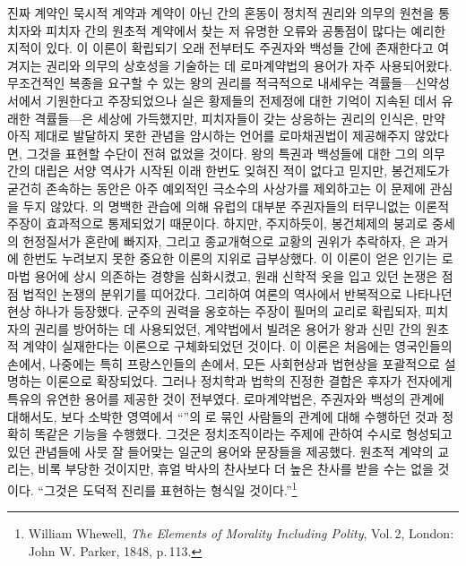 진짜 계약인 묵시적 계약과 계약이 아닌  간의 혼동이
정치적 권리와 의무의 원천을
통치자와 피치자 간의 원초적 계약에서
찾는
저 유명한 오류와 공통점이 많다는 예리한 지적이 있다.
이 이론이 확립되기 오래 전부터도
주권자와 백성들 간에 존재한다고 여겨지는
권리와 의무의 상호성을 기술하는 데
로마계약법의 용어가 자주 사용되어왔다.
무조건적인 복종을 요구할 수 있는 왕의 권리를 적극적으로 내세우는
격률들---신약성서에서 기원한다고 주장되었으나 실은
황제들의 전제정에 대한 기억이 지속된 데서 유래한 격률들---은
세상에 가득했지만,
피치자들이 갖는 상응하는 권리의 인식은,
만약
아직 제대로 발달하지 못한 관념을 암시하는 언어를
로마채권법이
제공해주지 않았다면,
그것을 표현할 수단이 전혀 없었을 것이다.
왕의 특권과 백성들에 대한 그의 의무 간의 대립은
서양 역사가 시작된 이래 한번도 잊혀진 적이 없다고 믿지만,
봉건제도가 굳건히 존속하는 동안은
아주 예외적인 극소수의 사상가를 제외하고는
이 문제에 관심을 두지 않았다.
의 명백한 관습에 의해
유럽의 대부분 주권자들의 터무니없는 이론적 주장이
효과적으로 통제되었기 때문이다.
하지만,
주지하듯이,
봉건체제의 붕괴로 중세의 헌정질서가 혼란에 빠지자,
그리고
종교개혁으로 교황의 권위가 추락하자,
은
과거에 한번도 누려보지 못한
중요한 이론의 지위로
급부상했다.
이 이론이 얻은 인기는
로마법 용어에 상시 의존하는 경향을 심화시켰고,
원래 신학적 옷을 입고 있던 논쟁은
점점
법적인 논쟁의 분위기를 띠어갔다.
그리하여 여론의 역사에서 반복적으로 나타나던 현상 하나가 등장했다.
군주의 권력을 옹호하는 주장이 필머의 교리로
확립되자,
피치자의 권리를 방어하는 데 사용되었던,
계약법에서 빌려온
용어가
왕과 신민 간의 원초적 계약이 실재한다는 이론으로
구체화되었던 것이다.
이 이론은 처음에는 영국인들의 손에서,
나중에는 특히 프랑스인들의 손에서,
모든 사회현상과 법현상을 포괄적으로 설명하는 이론으로 확장되었다.
그러나
정치학과 법학의 진정한 결합은
후자가 전자에게
특유의 유연한 용어를 제공한 것이 전부였다.
로마계약법은,
주권자와 백성의 관계에 대해서도,
보다 소박한 영역에서
``''의 로 묶인 사람들의 관계에 대해 수행하던 것과
정확히 똑같은 기능을 수행했다.
그것은
정치조직이라는 주제에 관하여 수시로 형성되고 있던 관념들에
사뭇 잘 들어맞는
일군의 용어와 문장들을 제공했다.
원초적 계약의 교리는,
비록 부당한 것이지만,
휴얼 박사의
찬사보다 더 높은 찬사를 받을 수는 없을 것이다.
``그것은 도덕적 진리를 표현하는  형식일 것이다.''\footnote{%
  \latinmarks
  William Whewell,
  \textit{The Elements of Morality Including Polity},
  Vol.\,2,
  London: John W. Parker, 1848,
  p.\,113.
  }


